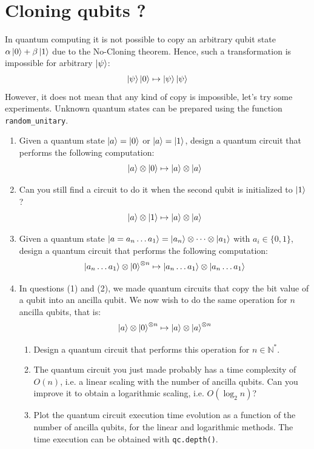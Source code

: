 \documentclass{article}
\begin{document}
\section{Cloning qubits ?}
In quantum computing it is not possible to copy an arbitrary qubit state $\alpha\ket{0}+\beta\ket{1}$ due to the No-Cloning theorem. Hence, such a transformation is impossible for arbitrary $\ket{\psi}$:
\begin{equation*}
    \ket{\psi}\ket{0} \mapsto \ket{\psi}\ket{\psi}
\end{equation*}
However, it does not mean that any kind of copy is impossible, let's try some experiments. Unknown quantum states can be prepared using the function \verb|random_unitary|.

\begin{enumerate}
    \item Given a quantum state $\ket{a}=\ket{0}$ or $\ket{a}=\ket{1}$, design a quantum circuit that performs the following computation:
    \begin{equation*}
        \ket{a}\otimes\ket{0} \mapsto \ket{a}\otimes\ket{a}
    \end{equation*}
    \item Can you still find a circuit to do it when the second qubit is initialized to $\ket{1}$ ?
    \begin{equation*}
        \ket{a}\otimes\ket{1} \mapsto \ket{a}\otimes\ket{a}
    \end{equation*}
     \item Given a quantum state $\ket{a=a_n\dots a_1}=\ket{a_n}\otimes\cdots\otimes\ket{a_1}$ with $a_i\in \{0,1\}$, design a quantum circuit that performs the following computation:
    \begin{equation*}
        \ket{a_n\dots a_1}\otimes\ket{0}^{\otimes n} \mapsto \ket{a_n\dots a_1}\otimes\ket{a_n\dots a_1}
    \end{equation*}
    \item In questions (1) and (2), we made quantum circuits that copy the bit value of a qubit into an ancilla qubit. We now wish to do the same operation for $n$ ancilla qubits, that is:
    \begin{equation*}
        \ket{a}\otimes\ket{0}^{\otimes n} \mapsto \ket{a}\otimes \ket{a}^{\otimes n}
    \end{equation*}
    \begin{enumerate}
        \item Design a quantum circuit that performs this operation for $n\in \mathbb{N}^*$.
        \item The quantum circuit you just made probably has a time complexity of $O(n)$, i.e. a linear scaling with the number of ancilla qubits. Can you improve it to obtain a logarithmic scaling, i.e. $O(\log_2 n)$?
        \item Plot the quantum circuit execution time evolution as a function of the number of ancilla qubits, for the linear and logarithmic methods. The time execution can be obtained with \verb|qc.depth()|.
    \end{enumerate}
    
\end{enumerate}
\end{document}
